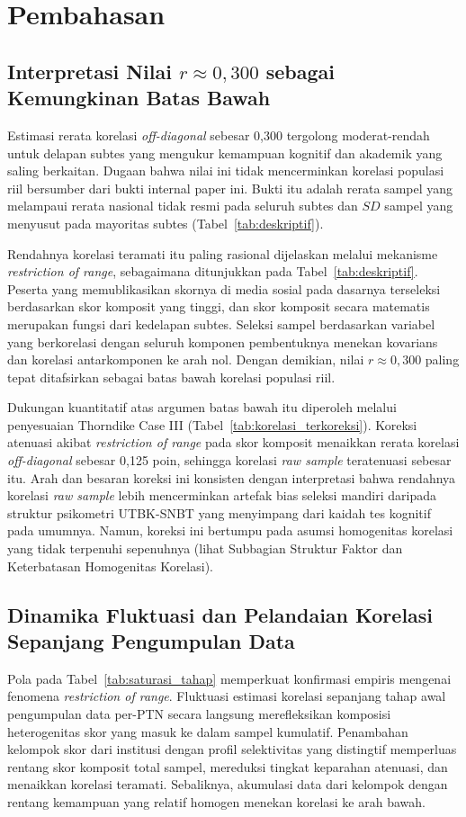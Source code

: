 \section{Pembahasan}

\subsection{Interpretasi Nilai \texorpdfstring{$r \approx 0,300$}{r ≈ 0,300} sebagai Kemungkinan Batas Bawah}
Estimasi rerata korelasi \textit{off-diagonal} sebesar 0,300 tergolong moderat-rendah untuk delapan subtes yang mengukur kemampuan kognitif dan akademik yang saling berkaitan. Dugaan bahwa nilai ini tidak mencerminkan korelasi populasi riil bersumber dari bukti internal paper ini. Bukti itu adalah rerata sampel yang melampaui rerata nasional tidak resmi pada seluruh subtes dan $SD$ sampel yang menyusut pada mayoritas subtes (Tabel~\ref{tab:deskriptif}).

Rendahnya korelasi teramati itu paling rasional dijelaskan melalui mekanisme \textit{restriction of range}, sebagaimana ditunjukkan pada Tabel~\ref{tab:deskriptif}. Peserta yang memublikasikan skornya di media sosial pada dasarnya terseleksi berdasarkan skor komposit yang tinggi, dan skor komposit secara matematis merupakan fungsi dari kedelapan subtes. Seleksi sampel berdasarkan variabel yang berkorelasi dengan seluruh komponen pembentuknya menekan kovarians dan korelasi antarkomponen ke arah nol. Dengan demikian, nilai $r \approx 0,300$ paling tepat ditafsirkan sebagai batas bawah korelasi populasi riil.

Dukungan kuantitatif atas argumen batas bawah itu diperoleh melalui penyesuaian Thorndike Case III (Tabel~\ref{tab:korelasi_terkoreksi}). Koreksi atenuasi akibat \textit{restriction of range} pada skor komposit menaikkan rerata korelasi \textit{off-diagonal} sebesar 0,125 poin, sehingga korelasi \textit{raw sample} teratenuasi sebesar itu. Arah dan besaran koreksi ini konsisten dengan interpretasi bahwa rendahnya korelasi \textit{raw sample} lebih mencerminkan artefak bias seleksi mandiri daripada struktur psikometri UTBK-SNBT yang menyimpang dari kaidah tes kognitif pada umumnya. Namun, koreksi ini bertumpu pada asumsi homogenitas korelasi yang tidak terpenuhi sepenuhnya (lihat Subbagian Struktur Faktor dan Keterbatasan Homogenitas Korelasi).

\subsection{Dinamika Fluktuasi dan Pelandaian Korelasi Sepanjang Pengumpulan Data}
Pola pada Tabel~\ref{tab:saturasi_tahap} memperkuat konfirmasi empiris mengenai fenomena \textit{restriction of range}. Fluktuasi estimasi korelasi sepanjang tahap awal pengumpulan data per-PTN secara langsung merefleksikan komposisi heterogenitas skor yang masuk ke dalam sampel kumulatif. Penambahan kelompok skor dari institusi dengan profil selektivitas yang distingtif memperluas rentang skor komposit total sampel, mereduksi tingkat keparahan atenuasi, dan menaikkan korelasi teramati. Sebaliknya, akumulasi data dari kelompok dengan rentang kemampuan yang relatif homogen menekan korelasi ke arah bawah.

